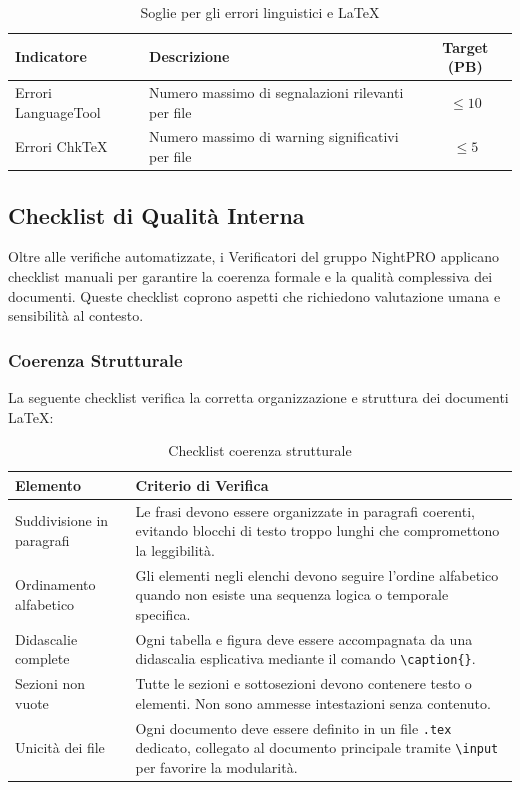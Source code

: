 \documentclass[a4paper,11pt,oneside]{scrartcl}
\begin{document}
\begin{table}[h!]
\centering
\renewcommand{\arraystretch}{1.3}
\begin{tabularx}{\textwidth}{lXc}
\toprule
\textbf{Indicatore} & \textbf{Descrizione} & \textbf{Target (PB)} \\
\midrule
Errori LanguageTool & Numero massimo di segnalazioni rilevanti per file & $\le 10$ \\
Errori ChkTeX & Numero massimo di warning significativi per file & $\le 5$ \\
\bottomrule
\end{tabularx}
\caption{Soglie per gli errori linguistici e \LaTeX}
\end{table}


\subsection{Checklist di Qualità Interna}

Oltre alle verifiche automatizzate, i Verificatori del gruppo NightPRO applicano checklist manuali per garantire la coerenza formale e la qualità complessiva dei documenti. Queste checklist coprono aspetti che richiedono valutazione umana e sensibilità al contesto.

\subsubsection{Coerenza Strutturale}

La seguente checklist verifica la corretta organizzazione e struttura dei documenti \LaTeX:

\begin{table}[H]
\centering
\renewcommand{\arraystretch}{1.4}
\begin{tabularx}{\textwidth}{@{}p{}X@{}}
\toprule
\textbf{Elemento} & \textbf{Criterio di Verifica} \\
\midrule
Suddivisione in paragrafi & Le frasi devono essere organizzate in paragrafi coerenti, evitando blocchi di testo troppo lunghi che compromettono la leggibilità. \\
\midrule
Ordinamento alfabetico & Gli elementi negli elenchi devono seguire l'ordine alfabetico quando non esiste una sequenza logica o temporale specifica. \\
\midrule
Didascalie complete & Ogni tabella e figura deve essere accompagnata da una didascalia esplicativa mediante il comando \texttt{\textbackslash caption\{\}}. \\
\midrule
Sezioni non vuote & Tutte le sezioni e sottosezioni devono contenere testo o elementi. Non sono ammesse intestazioni senza contenuto. \\
\midrule
Unicità dei file & Ogni documento deve essere definito in un file \texttt{.tex} dedicato, collegato al documento principale tramite \texttt{\textbackslash input} per favorire la modularità. \\
\bottomrule
\end{tabularx}
\caption{Checklist coerenza strutturale}
\end{table}
\end{document}
